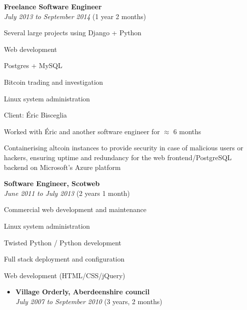 \documentclass[12pt]{article}
\newenvironment{outerlist}[1][\enskip\textbullet]%
	{\begin{itemize}[#1]}{\end{itemize}%
		\vspace{-.6\baselineskip}}
\newenvironment{innerlist}[1][\enskip\textbullet]%
	{\begin{compactitem}[#1]}{\end{compactitem}}
\newcommand{\halfblankline}{\quad\vspace{-0.5\baselineskip}\pagebreak[3]}
\begin{document}
		\halfblankline
		
		\vspace{-2mm}
		\begin{outerlist}
			\item[] \textbf{Freelance Software Engineer} \\
			\textit{July 2013 to September 2014} (1 year 2 months)
			\begin{innerlist}
				\item Several large projects using Django + Python
				\item Web development
				\item Postgres + MySQL
				\item Bitcoin trading and investigation
				\item Linux system administration
			\end{innerlist}
			\item[] Client: Éric Bisceglia
			\begin{innerlist}
				\item Worked with Éric and another software engineer for $\approx$ 6 months
				\item Containerising altcoin instances to provide security in case of malicious users or hackers, ensuring uptime and redundancy for the web frontend/PostgreSQL backend on Microsoft's Azure platform
			\end{innerlist}
		\end{outerlist}
		
		\halfblankline
		
		\vspace{-2mm}
		\begin{outerlist}
			\item[] \textbf{Software Engineer, Scotweb} \\
			\textit{June 2011 to July 2013} (2 years 1 month)
			\begin{innerlist}
				\item Commercial web development and maintenance
				\item Linux system administration
				\item Twisted Python / Python development
				\item Full stack deployment and configuration
				\item Web development (HTML/CSS/jQuery)
			\end{innerlist}
		\end{outerlist}
		
		\vspace{-2mm}
		\begin{outerlist}
			\item[] \textbf{Village Orderly, Aberdeenshire council} \\
			\textit{July 2007 to September 2010} (3 years, 2 months)
		\end{outerlist}
		
\end{document}
